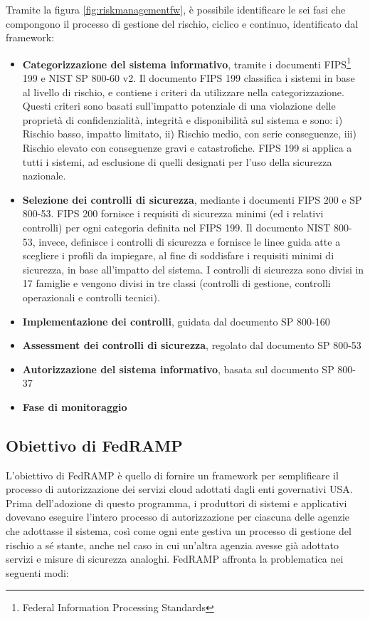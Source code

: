 \documentclass[../main.tex]{subfiles}
\begin{document}
Tramite la figura \ref{fig:riskmanagementfw}, è possibile identificare le sei fasi che compongono il processo di gestione del rischio, ciclico e continuo, identificato dal framework:

\begin{itemize}
    \item \textbf{Categorizzazione del sistema informativo}, tramite i documenti FIPS\footnote{Federal Information Processing Standards} 199 e NIST SP 800-60 v2\cite{nist80060}. Il documento FIPS 199 classifica i sistemi in base al livello di rischio, e contiene i criteri da utilizzare nella categorizzazione. Questi criteri sono basati sull'impatto potenziale di una violazione delle proprietà di confidenzialità, integrità e disponibilità sul sistema e sono: i) Rischio basso, impatto limitato, ii) Rischio medio, con serie conseguenze, iii) Rischio elevato con conseguenze gravi e catastrofiche. FIPS 199 si applica a tutti i sistemi, ad esclusione di quelli designati per l'uso della sicurezza nazionale.
    \item \textbf{Selezione dei controlli di sicurezza}, mediante i documenti FIPS 200 e SP 800-53. FIPS 200 fornisce i requisiti di sicurezza minimi (ed i relativi controlli) per ogni categoria definita nel FIPS 199.
        Il documento NIST 800-53\cite{nist2003nist}, invece, definisce i controlli di sicurezza e fornisce le linee guida atte a scegliere i profili da impiegare, al fine di soddisfare i requisiti minimi di sicurezza, in base all'impatto del sistema. I controlli di sicurezza sono divisi in 17 famiglie e vengono divisi in tre classi (controlli di gestione, controlli operazionali e controlli tecnici). 
    \item \textbf{Implementazione dei controlli}, guidata dal documento SP 800-160\cite{nist800160}
    \item \textbf{Assessment dei controlli di sicurezza}, regolato dal documento SP 800-53\cite{nist2003nist}
    \item \textbf{Autorizzazione del sistema informativo}, basata sul documento SP 800-37\cite{nist80037}
    \item \textbf{Fase di monitoraggio}\cite{nist800137}        
\end{itemize}

\subsection{Obiettivo di FedRAMP}
L'obiettivo di FedRAMP è quello di fornire un framework per semplificare il processo di autorizzazione dei servizi cloud adottati dagli enti governativi USA.
Prima dell'adozione di questo programma, i produttori di sistemi e applicativi dovevano eseguire l'intero processo di autorizzazione per ciascuna delle agenzie che adottasse il sistema, così come ogni ente gestiva un processo di gestione del rischio a sé stante, anche nel caso in cui un'altra agenzia avesse già adottato servizi e misure di sicurezza analoghi. 
FedRAMP affronta la problematica nei seguenti modi\cite{understandingFedRAMP}:
\end{document}
